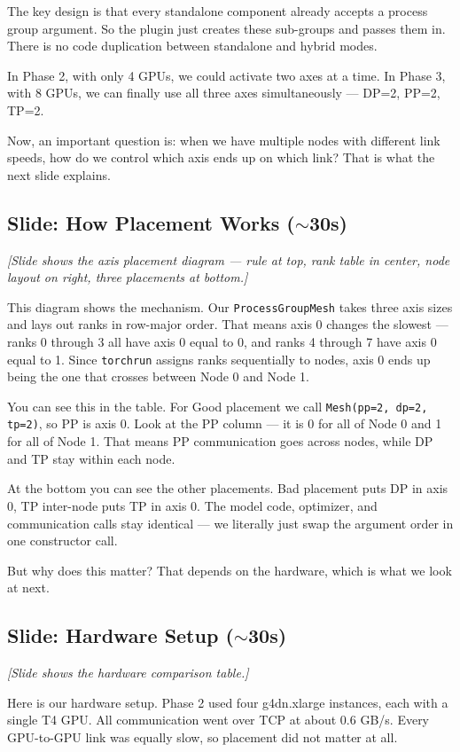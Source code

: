 \documentclass[11pt, a4paper]{article}
\begin{document}
The key design is that every standalone component already accepts a process group argument. So the plugin just creates these sub-groups and passes them in. There is no code duplication between standalone and hybrid modes.

In Phase 2, with only 4 GPUs, we could activate two axes at a time. In Phase 3, with 8 GPUs, we can finally use all three axes simultaneously --- DP=2, PP=2, TP=2.

Now, an important question is: when we have multiple nodes with different link speeds, how do we control which axis ends up on which link? That is what the next slide explains.

\subsection{Slide: How Placement Works ($\sim$30s)}
\textit{[Slide shows the axis placement diagram --- rule at top, rank table in center, node layout on right, three placements at bottom.]}

This diagram shows the mechanism. Our \texttt{ProcessGroupMesh} takes three axis sizes and lays out ranks in row-major order. That means axis 0 changes the slowest --- ranks 0 through 3 all have axis 0 equal to 0, and ranks 4 through 7 have axis 0 equal to 1. Since \texttt{torchrun} assigns ranks sequentially to nodes, axis 0 ends up being the one that crosses between Node 0 and Node 1.

You can see this in the table. For Good placement we call \texttt{Mesh(pp=2, dp=2, tp=2)}, so PP is axis 0. Look at the PP column --- it is 0 for all of Node 0 and 1 for all of Node 1. That means PP communication goes across nodes, while DP and TP stay within each node.

At the bottom you can see the other placements. Bad placement puts DP in axis 0, TP inter-node puts TP in axis 0. The model code, optimizer, and communication calls stay identical --- we literally just swap the argument order in one constructor call.

But why does this matter? That depends on the hardware, which is what we look at next.

\subsection{Slide: Hardware Setup ($\sim$30s)}
\textit{[Slide shows the hardware comparison table.]}

Here is our hardware setup. Phase 2 used four g4dn.xlarge instances, each with a single T4 GPU. All communication went over TCP at about 0.6 GB/s. Every GPU-to-GPU link was equally slow, so placement did not matter at all.
\end{document}
